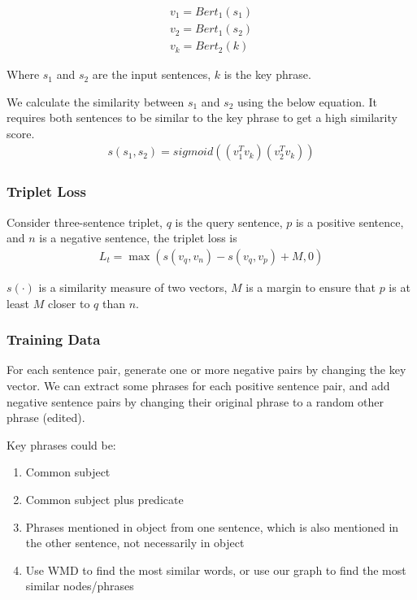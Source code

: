 \documentclass[letterpaper]{article}
\begin{document}
\begin{gather}
v_1 = Bert_1(s_1) \\
v_2 = Bert_1(s_2) \\
v_k = Bert_2(k)
\end{gather}

Where $s_1$ and $s_2$ are the input sentences, $k$ is the key phrase. 

We calculate the similarity between $s_1$ and $s_2$ using the below equation. It requires both sentences to be similar to the key phrase to get a high similarity score.
\begin{align}
s(s_1, s_2) = sigmoid((v_1^Tv_k)(v_2^Tv_k))
\end{align}

\subsubsection{Triplet Loss}
Consider three-sentence triplet, $q$ is the query sentence, $p$ is a positive sentence, and $n$ is a negative sentence, the triplet loss is 
\begin{align}
L_t = \max(s(v_q, v_n)-s(v_q, v_p)+M,0)
\end{align}

$s(\cdot)$ is a similarity measure of two vectors, $M$ is a margin to ensure that $p$ is at least $M$ closer to $q$ than $n$.

\subsubsection{Training Data}
For each sentence pair, generate one or more negative pairs by changing the key vector. We can extract some phrases for each positive sentence pair, and add negative sentence pairs by changing their original phrase to a random other phrase (edited).

Key phrases could be:
\begin{enumerate}
\item
Common subject

\item
Common subject plus predicate

\item
Phrases mentioned in object from one sentence, which is also mentioned in the other sentence, not necessarily in object

\item
Use WMD to find the most similar words, or use our graph to find the most similar nodes/phrases

\end{enumerate}
\end{document}
